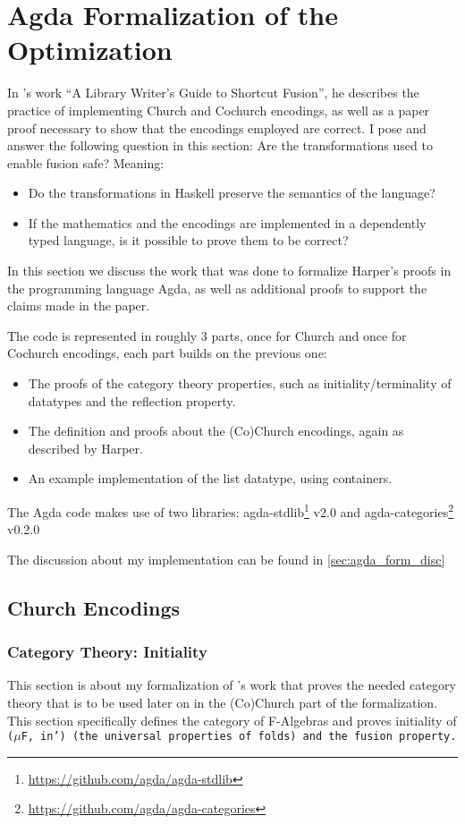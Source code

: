 \section{Agda Formalization of the Optimization}\label{sec:formalization}
In \cite{Harper2011}'s work ``A Library Writer's Guide to Shortcut Fusion'', he describes the practice of implementing Church and Cochurch encodings, as well as a paper proof necessary to show that the encodings employed are correct.
I pose and answer the following question in this section:
Are the transformations used to enable fusion safe? Meaning:
\begin{itemize}[noitemsep]
  \item Do the transformations in Haskell preserve the semantics of the language?
  \item If the mathematics and the encodings are implemented in a dependently typed language, is it possible to prove them to be correct?
\end{itemize}

In this section we discuss the work that was done to formalize Harper's proofs in the programming language Agda, as well as additional proofs to support the claims made in the paper.

The code is represented in roughly 3 parts, once for Church and once for Cochurch encodings, each part builds on the previous one:
\begin{itemize}
  \item The proofs of the category theory properties, such as initiality/terminality of datatypes and the reflection property.
  \item The definition and proofs about the (Co)Church encodings, again as described by Harper.
  \item An example implementation of the list datatype, using containers.
\end{itemize}

The Agda code makes use of two libraries: agda-stdlib\footnote{\url{https://github.com/agda/agda-stdlib}} v2.0 and agda-categories\footnote{\url{https://github.com/agda/agda-categories}} v0.2.0

The discussion about my implementation can be found in \autoref{sec:agda_form_disc}


\subsection{Church Encodings}
\subsubsection{Category Theory: Initiality}\label{sec:agda_init}
This section is about my formalization of \cite{Harper2011}'s work that proves the needed category theory that is to be used later on in the (Co)Church part of the formalization.
This section specifically defines the category of F-Algebras and proves initiality of \tt($\mu$F, in') (the universal properties of folds) and the fusion property.



